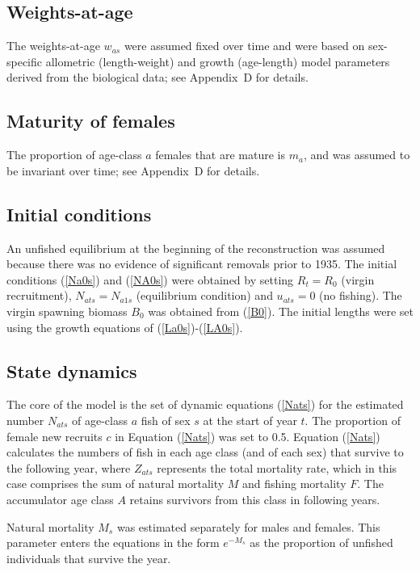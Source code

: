 \documentclass[11pt]{book}
\newcommand{\AppBio}{Appendix~D}
\newcommand{\eref}[1]{(\ref{#1})}
\begin{document}
\subsection{Weights-at-age}

The weights-at-age $w_{as}$ were assumed fixed over time and were based on sex-specific allometric (length-weight) and growth (age-length) model parameters derived from the biological data; see \AppBio{} for details.

\subsection{Maturity of females}

The proportion of age-class $a$ females that are mature is $m_a$, and was assumed to be invariant over time; see \AppBio{} for details.

\subsection{Initial conditions}

An unfished equilibrium at the beginning of the reconstruction was assumed because there was no evidence of significant removals prior to 1935.
The initial conditions \eref{Na0s} and \eref{NA0s} were obtained by setting $R_t = R_0$ (virgin recruitment), $N_{ats} = N_{a1s}$ (equilibrium condition) and $u_{ats} = 0$ (no fishing).
The virgin spawning biomass $B_0$ was obtained from \eref{B0}.
The initial lengths were set using the growth equations of \citet{Schnute:1981} \eref{La0s}-\eref{LA0s}.

\subsection{State dynamics}

The core of the model is the set of dynamic equations \eref{Nats} for the estimated number $N_{ats}$ of age-class $a$ fish of sex $s$ at the start of year $t$. 
The proportion of female new recruits $c$ in Equation \eref{Nats} was set to 0.5.
Equation \eref{Nats} calculates the numbers of fish in each age class (and of each sex) that survive to the following year, where $Z_{ats}$ represents the total mortality rate, which in this case comprises the sum of natural mortality $M$ and fishing mortality $F$. 
The accumulator age class $A$ retains survivors from this class in following years.

Natural mortality $M_s$ was estimated separately for males and females.
This parameter enters the equations in the form $e^{-M_s}$ as the proportion of unfished individuals that survive the year.
\end{document}
